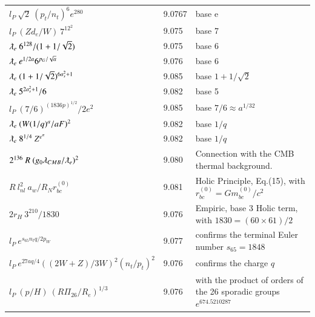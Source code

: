 \documentclass[a4paper,9pt]{article}
\begin{document}
\begin{table}
\begin{tabular}{lll}
 
 $ l_P ~ \sqrt2 ~ (p_t/n_t)^6 e^{280}  $ & 9.0767 & base e  \\
 
 
 $ l_P ~ (Zd_e/W) ~7^{12^2}  $ & 9.075 & base 7  \\
 
 
 $ \lambdabar_e ~ 6^{128}/(1+1/\sqrt 2)  $ & 9.075 & base 6 \\
 
 $ \lambdabar_e ~ e^{1/2a} 6^{p_G/\sqrt a}  $ & 9.076 & base 6 \\
 
 
 
 
 
  $ \lambdabar_e ~ (1+1/\sqrt 2)^{6a_s^2+1}  $ & 9.085 & base $1+1/\sqrt 2$ \\
 
 
  $ \lambdabar_e ~ 5^{2a_s^2+1}/6  $ & 9.082 & base 5 \\
  
  $ l_P ~ (7/6)^{(1836p)^{1/2}}/2e^2  $ & 9.085 & base $7/6 \approx a^{1/32}$ \\
  
  
   $ \lambdabar_e ~ (W(1/q)^{a}/aF)^2  $ & 9.082 & base $1/q$ \\
   
   $ \lambdabar_e ~ 8^{1/4}~ Z^{e^{\pi}}  $ & 9.082 & base $1/q$ \\
 
 
 $ 2^{136}~R~(g_0\lambda_{CMB}/\lambdabar_e)^2  $ & 9.080 & Connection with the CMB thermal background.    \\
 
 $ R~l_{nl}^2~a_w/R_Nr_{bc}^{(0)} $ & 9.081 & Holic Principle, Eq.(15), with $ r_{bc}^{(0)}= Gm_{bc}^{(0)}/c^2$    \\
 
 $ 2r_H~ 3^{210}/1830$& 9.076 & Empiric, base 3 Holic term, with $ 1830 = (60\times 61)/2 $   \\
 
 
 
 $  l_P~ e^{s_{65}n_tq/2p_W}$& 9.077 & confirms the terminal Euler number $s_{65} = 1848 $   \\
 
 
 
 $ l_P~ e^{27aq/4} ((2W+Z)/3W)^2(n_t/p_t)^2$& 9.076 & confirms the charge $q$   \\
 
 
 
 
 
  
  $l_P~(p/H) ~(R \Pi_{26}/R_e)^{1/3} $ & 9.076 & with the product of orders of the 26 sporadic groups $e^{674.5210287}$ \cite{Sanchez2}  \\ 
  

\end{tabular}
\end{table}
\end{document}
